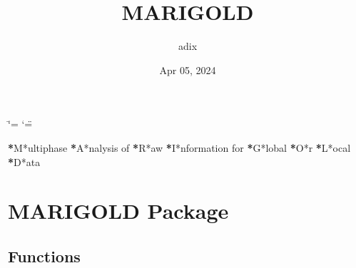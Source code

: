 \documentclass[letterpaper,10pt,english]{sphinxmanual}
\title{MARIGOLD}
\date{Apr 05, 2024}
\author{adix}
\begin{document}
\ifdefined\shorthandoff
  \ifnum\catcode`\=\string=\active\shorthandoff{=}\fi
  \ifnum\catcode`\"=\active{}\fi
\fi

\pagestyle{empty}
\sphinxmaketitle
\pagestyle{plain}
\sphinxtableofcontents
\pagestyle{normal}
\label{\detokenize{index::doc}}


\sphinxAtStartPar
{\color{red}\bfseries{}*}M*ultiphase {\color{red}\bfseries{}*}A*nalysis of {\color{red}\bfseries{}*}R*aw {\color{red}\bfseries{}*}I*nformation for {\color{red}\bfseries{}*}G*lobal {\color{red}\bfseries{}*}O*r {\color{red}\bfseries{}*}L*ocal {\color{red}\bfseries{}*}D*ata


\chapter{MARIGOLD Package}
\label{\detokenize{index:module-MARIGOLD}}\label{\detokenize{index:marigold-package}}

\section{Functions}
\label{\detokenize{index:functions}}
\end{document}
